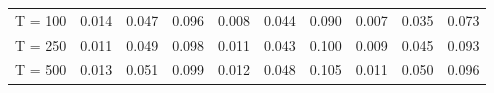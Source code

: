 % 
\begin{tabular}{cccccccccc}
  \hline
  \hline
T = 100 & 0.014 & 0.047 & 0.096 & 0.008 & 0.044 & 0.090 & 0.007 & 0.035 & 0.073 \\ 
  T = 250 & 0.011 & 0.049 & 0.098 & 0.011 & 0.043 & 0.100 & 0.009 & 0.045 & 0.093 \\ 
  T = 500 & 0.013 & 0.051 & 0.099 & 0.012 & 0.048 & 0.105 & 0.011 & 0.050 & 0.096 \\ 
   \hline
\end{tabular}

